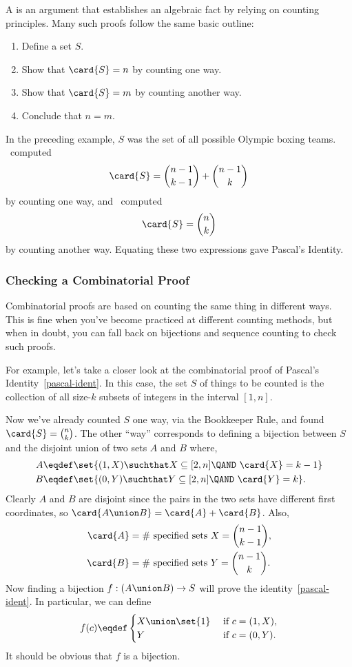 A  is an argument that establishes an
algebraic fact by relying on counting principles.  Many such proofs
follow the same basic outline:
%
\begin{enumerate}

\item Define a set $S$.

\item Show that $\card{S} = n$ by counting one way.

\item Show that $\card{S} = m$ by counting another way.

\item Conclude that $n = m$.

\end{enumerate}
%
In the preceding example, $S$ was the set of all possible Olympic boxing
teams.  \Jay\ computed
\[
\card{S} = \binom{n-1}{k-1} + \binom{n-1}{k}
\]
by counting one way, and \Jer\ computed
\[
\card{S} = \binom{n}{k}
\]
by counting another way.  Equating these two expressions gave Pascal's
Identity.

\subsubsection{Checking a Combinatorial Proof}

Combinatorial proofs are based on counting the same thing in different
ways.  This is fine when you've become practiced at different counting
methods, but when in doubt, you can fall back on bijections and
sequence counting to check such proofs.

For example, let's take a closer look at the combinatorial proof of
Pascal's Identity~\eqref{pascal-ident}.  In this case, the set $S$ of
things to be counted is the collection of all size-$k$ subsets of
integers in the interval $[1,n]$.

Now we've already counted $S$ one way, via the Bookkeeper Rule, and
found $\card{S} = \binom{n}{k}$.  The other ``way'' corresponds to
defining a bijection between $S$ and the disjoint union of two sets
$A$ and $B$ where,
\begin{align*}
A & \eqdef \set{(1,X) \suchthat X \subseteq [2,n] \QAND\ \card{X}=k-1}\\
B & \eqdef \set{(0,Y) \suchthat Y \subseteq [2,n] \QAND\ \card{Y}=k}.
\end{align*}
Clearly $A$ and $B$ are disjoint since the pairs in the two sets have
different first coordinates, so $\card{A \union B} = \card{A} +
\card{B}$.  Also,
\begin{align*}
\card{A} & = \text{\# specified sets $X$} =  \binom{n-1}{k-1},\\
\card{B} & = \text{\# specified sets $Y$} = \binom{n-1}{k}.
\end{align*}
Now finding a bijection $f:(A \union B) \to S$ will prove the
identity~\eqref{pascal-ident}.  In particular, we can define
\[
f(c) \eqdef \begin{cases} X \union \set{1} &\text{ if } c = (1,X),\\
                          Y  &\text{ if } c = (0,Y).
\end{cases}
\]
It should be obvious that $f$ is a bijection.

